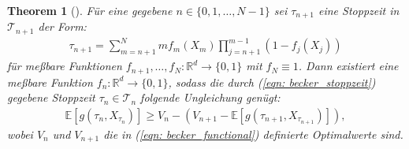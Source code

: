 \documentclass[12pt,titlepage,headsepline]{article}
\newtheorem*{theorem-non}{Theorem}
\begin{document}
      \begin{theorem-non}[\cite{becker_deep_2019,Theorem 1}]
        Für eine gegebene $n \in \{0,1,\ldots,N-1\}$ sei $\tau_{n+1}$ eine Stoppzeit in $\mathcal{T}_{n+1}$ der Form:
        \begin{align*}
          \tau_{n+1} = \sum_{m={n+1}}^N mf_m(X_m)\prod_{j={n+1}}^{m-1}(1-f_j(X_j))
        \end{align*}
        für meßbare Funktionen $f_{n+1},\ldots,f_N:\mathbb{R}^d \rightarrow \{0,1\}$ mit $f_N \equiv 1$. Dann existiert eine meßbare Funktion $f_n: \mathbb{R}^d \rightarrow \{0,1\}$, sodass die durch (\ref{eqn: becker_stoppzeit}) gegebene Stoppzeit $\tau_n \in \mathcal{T}_n$ folgende Ungleichung genügt:
        \begin{align*}
          \mathbb{E}[g(\tau_n,X_{\tau_n})] \geq V_n - (V_{n+1} - \mathbb{E}[g(\tau_{n+1},X_{\tau_{n+1}})]),
        \end{align*}
        wobei $V_n$ und $V_{n+1}$ die in (\ref{eqn: becker_functional}) definierte Optimalwerte sind.
      \end{theorem-non}
\end{document}
